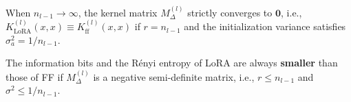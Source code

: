 \documentclass[final,hyperref={pdfpagelabels=false}]{beamer}
\begin{document}
\begin{frame}[t]
\begin{columns}[t]
\begin{column}{.34\textwidth}
\begin{corollary}\label{th:full-rank}
When $n_{l-1}\rightarrow \infty$, the kernel matrix $M_{\Delta}^{(l)}$
strictly converges to
$\mathbf{0}$, i.e., $K_{\text{LoRA}}^{(l)}(x,x)\equiv
K_{\text{ff}}^{(l)}(x,x)$ if $r=n_{l-1}$ and the initialization variance
satisfies $\sigma^{2}_{a}=1/n_{l-1}$.
\end{corollary}

\begin{theorem}\label{th:ib-leq}
  The information bits and the R\'enyi entropy of LoRA are always \textbf{smaller} than those of FF if $M^{(l)}_{\Delta}$ is a negative
  semi-definite matrix, i.e., $r\leq n_{l-1}$ and $\sigma^{2}\leq 1/n_{l-1}$.
\end{theorem}

    

\end{column} %


\end{columns} %
\end{frame} %
\end{document}
